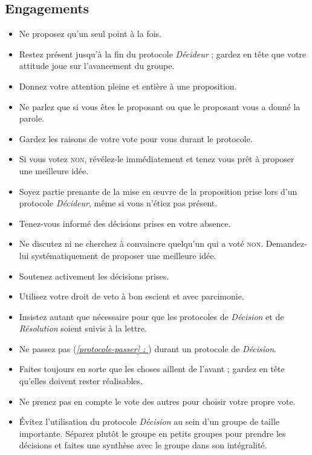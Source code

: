 \documentclass[paper=6in:9in,pagesize=pdftex,headinclude=on,footinclude=on,12pt]{scrbook}
\newcommand*{\fullref}[1]{\textit{\hyperref[{#1}]{\autoref*{#1} : \nameref*{#1}}}}
\begin{document}
\subsection{Engagements}
\begin{itemize}
	\item Ne proposez qu'un seul point à la fois.
	\item Restez présent jusqu'à la fin du protocole \emph{Décideur} ; gardez en tête que votre attitude joue sur l'avancement du groupe.
	\item Donnez votre attention pleine et entière à une proposition.
	\item Ne parlez que si vous êtes le proposant ou que le proposant vous a donné la parole.
	\item Gardez les raisons de votre vote pour vous durant le protocole.
	\item Si vous votez \textsc{non}, révélez-le immédiatement et tenez vous prêt à proposer une meilleure idée.
	\item Soyez partie prenante de la mise en œuvre de la proposition prise lors d'un protocole \emph{Décideur}, même si vous n'étiez pas présent.
	\item Tenez-vous informé des décisions prises en votre absence.
	\item Ne discutez ni ne cherchez à convaincre quelqu'un qui a voté \textsc{non}. Demandez-lui systématiquement de proposer une meil\-leure idée.
	\item Soutenez activement les décisions prises.
	\item Utilisez votre droit de veto à bon escient et avec parcimonie.
	\item Insistez autant que nécessaire pour que les protocoles de \emph{Décision} et de \emph{Résolution} soient suivis à la lettre.
	\item Ne passez pas (\fullref{protocole-passer}) durant un protocole de \emph{Décision}.
	\item Faites toujours en sorte que les choses aillent de l'avant ; gardez en tête qu'elles doivent rester réalisables.
	\item Ne prenez pas en compte le vote des autres pour choisir votre propre vote.
	\item Évitez l'utilisation du protocole \emph{Décision} au sein d'un groupe de taille importante. Séparez plutôt le groupe en petits groupes pour prendre les
	      décisions et faites une synthèse avec le groupe dans son intégralité.
\end{itemize}
\end{document}
